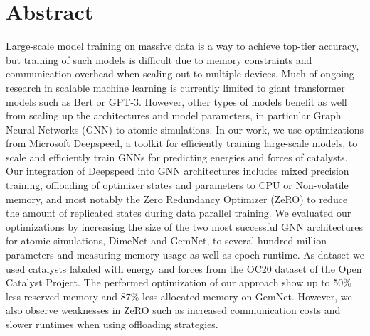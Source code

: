 \section*{Abstract}

Large-scale model training on massive data is a way to achieve top-tier 
accuracy, but training of such models is difficult due to memory constraints and communication overhead 
when scaling out to multiple devices. Much of ongoing research in scalable machine learning is 
currently limited to  giant transformer models such as Bert or GPT-3. However, other types of 
models benefit as well from scaling up the architectures and model parameters, 
in particular Graph Neural Networks (GNN) to atomic simulations. In our work, 
we use optimizations from Microsoft Deepspeed, a toolkit for efficiently training 
large-scale models, to scale and efficiently train GNNs for predicting energies 
and forces of catalysts. Our integration of Deepspeed into GNN architectures includes 
mixed precision training, offloading of optimizer states and parameters to CPU or Non-volatile 
memory, and most notably the Zero Redundancy Optimizer (ZeRO) to reduce the amount of 
replicated states during data parallel training. We evaluated our optimizations by increasing 
the size of the two most successful GNN architectures for atomic simulations, DimeNet 
and GemNet, to several hundred million parameters and measuring memory usage as well as epoch 
runtime. As dataset we used catalysts labaled with energy and forces from the OC20 dataset of 
the Open Catalyst Project. The performed optimization of our approach show up to 
50\% less reserved memory and 87\% less allocated memory on GemNet. However, we also observe 
weaknesses in ZeRO such as increased communication costs and slower 
runtimes when using offloading strategies. 